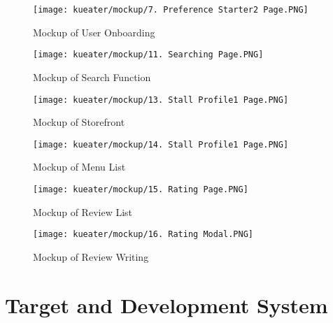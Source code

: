 \begin{figure}[h!]
    \begin{minipage}{.5\textwidth}
        \centering
        \texttt{[image: kueater/mockup/7. Preference Starter2 Page.PNG]}
        \small{\caption{Mockup of User Onboarding}}
    \end{minipage}%
    \begin{minipage}{.5\textwidth}
        \centering
        \texttt{[image: kueater/mockup/11. Searching Page.PNG]}
        \small{\caption{Mockup of Search Function}}
    \end{minipage}
    \vspace*{-\baselineskip}
\end{figure}

\begin{figure}[h!]
    \begin{minipage}{.5\textwidth}
        \centering
        \texttt{[image: kueater/mockup/13. Stall Profile1 Page.PNG]}
        \small{\caption{Mockup of Storefront}}
    \end{minipage}%
    \begin{minipage}{.5\textwidth}
        \centering
        \texttt{[image: kueater/mockup/14. Stall Profile1 Page.PNG]}
        \small{\caption{Mockup of Menu List}}
    \end{minipage}
    \vspace*{-\baselineskip}
\end{figure}


\begin{figure}[h!t]
    \begin{minipage}{.5\textwidth}
        \centering
        \texttt{[image: kueater/mockup/15. Rating Page.PNG]}
        \small{\caption{Mockup of Review List}}
    \end{minipage}%
    \begin{minipage}{.5\textwidth}
        \centering
        \texttt{[image: kueater/mockup/16. Rating Modal.PNG]}
        \small{\caption{Mockup of Review Writing}}
    \end{minipage}
\end{figure}


\newpage

\section{Target and Development System}
\label{section:development-system}

